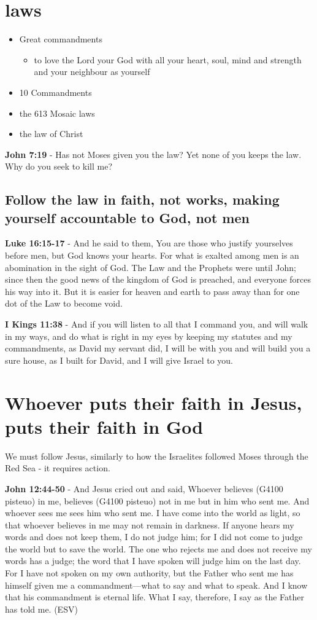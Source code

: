 \documentclass[11pt]{article}
\begin{document}
\section{laws}
\label{sec:org4e10588}
\begin{itemize}
\item Great commandments
\begin{itemize}
\item to love the Lord your God with all your heart, soul, mind and strength and your neighbour as yourself
\end{itemize}
\item 10 Commandments
\item the 613 Mosaic laws
\item the law of Christ
\end{itemize}

\textbf{John 7:19} - Has not Moses given you the law? Yet none of you keeps the law. Why do you seek to kill me?

\subsection{Follow the law in faith, not works, making yourself accountable to God, not men}
\label{sec:org3850d65}
\textbf{Luke 16:15-17} - And he said to them, You are those who justify yourselves before men, but God knows your hearts. For what is exalted among men is an abomination in the sight of God.  The Law and the Prophets were until John; since then the good news of the kingdom of God is preached, and everyone forces his way into it.  But it is easier for heaven and earth to pass away than for one dot of the Law to become void.

\textbf{I Kings 11:38} - And if you will listen to all that I command you, and will walk in my ways, and do what is right in my eyes by keeping my statutes and my commandments, as David my servant did, I will be with you and will build you a sure house, as I built for David, and I will give Israel to you.

\section{Whoever puts their faith in Jesus, puts their faith in God}
\label{sec:orgd6dfd84}
We must follow Jesus, similarly to how the Israelites followed Moses through the Red Sea - it requires action.

\textbf{John 12:44-50} - And Jesus cried out and said, Whoever believes (G4100 pisteuo) in me, believes (G4100 pisteuo) not in me but in him who sent me.  And whoever sees me sees him who sent me.  I have come into the world as light, so that whoever believes in me may not remain in darkness.  If anyone hears my words and does not keep them, I do not judge him; for I did not come to judge the world but to save the world.  The one who rejects me and does not receive my words has a judge; the word that I have spoken will judge him on the last day.  For I have not spoken on my own authority, but the Father who sent me has himself given me a commandment—what to say and what to speak.  And I know that his commandment is eternal life.  What I say, therefore, I say as the Father has told me. (ESV)
\end{document}
